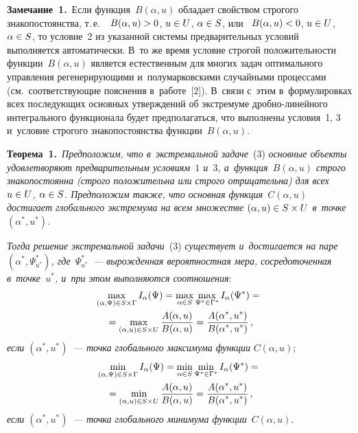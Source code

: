 \begin{multicols}{2}
\noindent
     \textbf{Замечание~1.}\ Если функция~$B(\alpha, u)$ обладает свойством 
строгого знакопостоянства, т.\,е.\ ~$B(\alpha, u)\hm>0$, $u\hm\in U$, 
$\alpha\hm\in S$, или ~$B(\alpha, u) \hm<0$, $u\hm\in U$, $\alpha\hm\in S$, то 
условие~2 из указанной сис\-те\-мы предварительных условий выполняется 
автоматически. В~то же время условие строгой по\-ло\-жи\-тель\-ности 
функции~$B(\alpha, u)$ является естественным для многих задач оптимального 
управления регенерирующими и~полумарковскими случайными процессами 
(см.\ соответствующие пояснения в~работе~[2]). В~связи с~этим 
в~формулировках всех по\-сле\-ду\-ющих основных утверж\-де\-ний об экстремуме 
дроб\-но-ли\-ней\-но\-го интегрального функционала будет предполагаться, что 
выполнены условия~1, 3 и~условие строгого знакопостоянства 
функции~$B(\alpha, u)$.
     
     \smallskip
     
     \noindent
\textbf{Теорема~1.}\ \textit{Предположим, что в~экстремальной 
задаче}~(3) \textit{основные объекты удовле\-тво\-ря\-ют предварительным
условиям~$1$ и~$3$, а~функция~$B(\alpha, u)$ строго знакопостоянна (строго положительна 
или строго отрицательна) для всех $u\hm\in U$, $\alpha\hm\in S$. Предположим 
также, что основная функ\-ция~$C(\alpha, u)$ достигает глобального экстремума 
на всем множестве $(\alpha, u)\hm\in S\times U$ в~точке~$(\alpha^*, u^*)$.}
     
     \textit{Тогда решение экстремальной задачи}~(3) \textit{существует 
и~достигается на паре $(\alpha^*, \Psi^*_{u^*})$, где~$\Psi^*_{u^*}$~--- 
вы\-рож\-ден\-ная вероятностная мера, сосредоточенная в~точ\-ке~$u^*$, и~при этом 
выполняются соотношения}:
     \begin{multline*}
     \max\limits_{(\alpha,\Psi)\in S\times \Gamma} I_\alpha(\Psi) =  
\max\limits_{\alpha\in S} \max\limits_{\Psi^*\in \Gamma^*} I_\alpha(\Psi^*)={}\\
     {}= \max\limits_{(\alpha,u)\in S\times U} \displaystyle\frac{\displaystyle A(\alpha,u)\mathstrut}{\displaystyle B(\alpha,u)\mathstrut}=
     \displaystyle\frac{\displaystyle A(\alpha^*,u^*)\mathstrut}{\displaystyle B(\alpha^*,u^*)\mathstrut}\,,
     \end{multline*}
\textit{если $(\alpha^*,u^*)$~--- точка глобального максимума функции} 
$C(\alpha, u)$;
     \begin{multline*}
     \min\limits_{(\alpha,\Psi)\in S\times \Gamma} I_\alpha(\Psi) =  
\min\limits_{\alpha\in S} \min\limits_{\Psi^*\in \Gamma^*} I_\alpha(\Psi^*)={}\\
     {}= \min\limits_{(\alpha,u)\in S\times U} \displaystyle\frac{\displaystyle A(\alpha,u)\mathstrut}{\displaystyle B(\alpha,u)\mathstrut}=
     \displaystyle\frac{\displaystyle A(\alpha^*,u^*)\mathstrut}{\displaystyle B(\alpha^*,u^*)\mathstrut}\,,
\end{multline*}
\textit{если $(\alpha^*,u^*)$~--- точка глобального минимума 
функции}~$C(\alpha, u)$.


\end{multicols}
